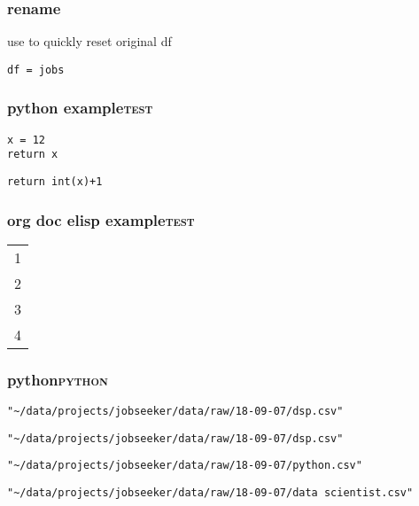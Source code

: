 \documentclass[11pt]{article}
\begin{document}
\subsubsection{rename}
\label{sec:orgdeb5e15}
use to quickly reset original df
\begin{verbatim}
df = jobs
\end{verbatim}

\subsubsection{python example\hfill{}\textsc{test}}
\label{sec:org0c431f9}
\begin{verbatim}
x = 12
return x
\end{verbatim}

\begin{verbatim}
return int(x)+1
\end{verbatim}

\subsubsection{org doc elisp example\hfill{}\textsc{test}}
\label{sec:org7e6ef07}
\begin{center}
\label{tab:orgab82199}
\begin{tabular}{r}
1\\
2\\
3\\
4\\
\end{tabular}
\end{center}

\subsubsection{python\hfill{}\textsc{python}}
\label{sec:org73176e5}
\begin{verbatim}
"~/data/projects/jobseeker/data/raw/18-09-07/dsp.csv"
\end{verbatim}

\begin{verbatim}
"~/data/projects/jobseeker/data/raw/18-09-07/dsp.csv"
\end{verbatim}

\begin{verbatim}
"~/data/projects/jobseeker/data/raw/18-09-07/python.csv"
\end{verbatim}

\begin{verbatim}
"~/data/projects/jobseeker/data/raw/18-09-07/data scientist.csv"
\end{verbatim}
\end{document}
